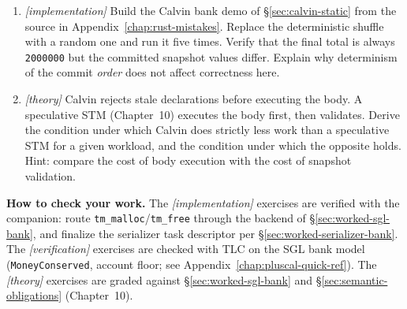 \begin{enumerate}
    \item \emph{[implementation]} Build the Calvin bank demo of \S\ref{sec:calvin-static} from the source in Appendix~\ref{chap:rust-mistakes}. Replace the deterministic shuffle with a random one and run it five times. Verify that the final total is always \texttt{2000000} but the committed snapshot values differ. Explain why determinism of the commit \emph{order} does not affect correctness here.
    \item \emph{[theory]} Calvin rejects stale declarations before executing the body. A speculative STM (Chapter~10) executes the body first, then validates. Derive the condition under which Calvin does strictly less work than a speculative STM for a given workload, and the condition under which the opposite holds. Hint: compare the cost of body execution with the cost of snapshot validation.
\end{enumerate}

\textbf{How to check your work.} The \emph{[implementation]} exercises are
verified with the companion: route \texttt{tm\_malloc}/\texttt{tm\_free}
through the backend of \S\ref{sec:worked-sgl-bank}, and finalize the
serializer task descriptor per \S\ref{sec:worked-serializer-bank}.  The
\emph{[verification]} exercises are checked with TLC on the SGL bank model
(\texttt{MoneyConserved}, account floor; see
Appendix~\ref{chap:pluscal-quick-ref}).  The \emph{[theory]} exercises are
graded against \S\ref{sec:worked-sgl-bank} and \S\ref{sec:semantic-obligations}
(Chapter~10).



